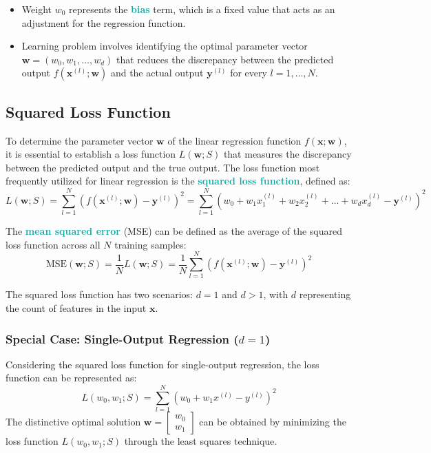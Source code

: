 \documentclass[twoside]{article}
\newcommand{\highlightbluetext}[1]{\textcolor[HTML]{09ACA6}{\textbf{#1}}}
\numberwithin{equation}{section}
\begin{document}
	\begin{itemize}
		\item Weight $w_0$ represents the \highlightbluetext{bias} term, which is a fixed value that acts as an adjustment for the regression function. 
		\item Learning problem involves identifying the optimal parameter vector $\mathbf{w} = (w_0, w_1, \ldots, w_d)$ that reduces the discrepancy between the predicted output $f(\mathbf{x}^{(l)} ; \mathbf{w})$ and the actual output $\mathbf{y}^{(l)}$ for every $l = 1, \ldots, N$.
	\end{itemize}

	\subsection{Squared Loss Function}
	\label{subsec:SquaredLossFunction}
	To determine the parameter vector $\mathbf{w}$ of the linear regression function $f(\mathbf{x}; \mathbf{w})$, it is essential to establish a loss function $L(\mathbf{w}; S)$ that measures the discrepancy between the predicted output and the true output. The loss function most frequently utilized for linear regression is the \highlightbluetext{squared loss function}, defined as:
	\begin{equation}
	\label{eq:SquaredLossFunction}
	\boxed{L(\mathbf{w}; S) = \sum_{l=1}^N \left( f(\mathbf{x}^{(l)}; \mathbf{w}) - \mathbf{y}^{(l)} \right)^2 = \sum_{l=1}^N \left( w_0 + w_1 x_1^{(l)} + w_2 x_2^{(l)} + \ldots + w_d x_d^{(l)} - \mathbf{y}^{(l)} \right)^2}
	\end{equation}

	The \highlightbluetext{mean squared error} (MSE) can be defined as the average of the squared loss function across all $N$ training samples:
	\begin{equation}
	\label{eq:MeanSquaredError}
	\boxed{\text{MSE}(\mathbf{w}; S) = \frac{1}{N} L(\mathbf{w}; S) = \frac{1}{N} \sum_{l=1}^N \left( f(\mathbf{x}^{(l)}; \mathbf{w}) - \mathbf{y}^{(l)} \right)^2}
	\end{equation}

	\newpage
	The squared loss function has two scenarios: $d = 1$ and $d > 1$, with $d$ representing the count of features in the input $\mathbf{x}$.

	\subsubsection{Special Case: Single-Output Regression ($d = 1$)}
	\label{subsubsec:SingleOutputRegression}
	Considering the squared loss function for single-output regression, the loss function can be represented as:
	\begin{equation}
	\label{eq:SingleOutputRegressionLossFunction}
	\boxed{L(w_0, w_1; S) = \sum_{l=1}^N \left( w_0 + w_1 x^{(l)} - y^{(l)} \right)^2}
	\end{equation}
	The distinctive optimal solution $\mathbf{w} = \begin{bmatrix} w_0 \\ w_1 \end{bmatrix}$ can be obtained by minimizing the loss function $L(w_0, w_1; S)$ through the least squares technique. 
	
\end{document}
